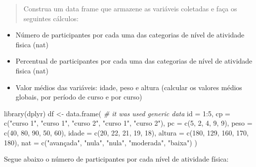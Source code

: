 \documentclass[
]{article}
\newenvironment{Shaded}{\begin{snugshade}}{\end{snugshade}}
\newcommand{\AttributeTok}[1]{\textcolor[rgb]{0.77,0.63,0.00}{#1}}
\newcommand{\CommentTok}[1]{\textcolor[rgb]{0.56,0.35,0.01}{\textit{#1}}}
\newcommand{\DecValTok}[1]{\textcolor[rgb]{0.00,0.00,0.81}{#1}}
\newcommand{\FunctionTok}[1]{\textcolor[rgb]{0.00,0.00,0.00}{#1}}
\newcommand{\NormalTok}[1]{#1}
\newcommand{\OtherTok}[1]{\textcolor[rgb]{0.56,0.35,0.01}{#1}}
\newcommand{\SpecialCharTok}[1]{\textcolor[rgb]{0.00,0.00,0.00}{#1}}
\newcommand{\StringTok}[1]{\textcolor[rgb]{0.31,0.60,0.02}{#1}}
\providecommand{\tightlist}{%
  \setlength{\itemsep}{0pt}\setlength{\parskip}{0pt}}
\begin{document}
\begin{quote}
Construa um data frame que armazene as variáveis coletadas e faça os
seguintes cálculos:
\end{quote}

\begin{itemize}
\tightlist
\item
  Número de participantes por cada uma das categorias de nível de
  atividade fisica (nat)
\item
  Percentual de participantes por cada uma das categorias de nível de
  atividade fisica (nat)
\item
  Valor médios das variáveis: idade, peso e altura (calcular os valores
  médios globais, por período de curso e por curso)
\end{itemize}

\begin{Shaded}
\begin{Highlighting}[]
\FunctionTok{library}\NormalTok{(dplyr)}
\NormalTok{df }\OtherTok{\textless{}{-}} \FunctionTok{data.frame}\NormalTok{( }\CommentTok{\# it was used generic data}
  \AttributeTok{id =} \DecValTok{1}\SpecialCharTok{:}\DecValTok{5}\NormalTok{,}
  \AttributeTok{cp =} \FunctionTok{c}\NormalTok{(}\StringTok{"curso 1"}\NormalTok{, }\StringTok{"curso 1"}\NormalTok{, }\StringTok{"curso 2"}\NormalTok{, }\StringTok{"curso 1"}\NormalTok{, }\StringTok{"curso 2"}\NormalTok{),}
  \AttributeTok{pc =} \FunctionTok{c}\NormalTok{(}\DecValTok{5}\NormalTok{, }\DecValTok{2}\NormalTok{, }\DecValTok{4}\NormalTok{, }\DecValTok{9}\NormalTok{, }\DecValTok{9}\NormalTok{),}
  \AttributeTok{peso =} \FunctionTok{c}\NormalTok{(}\DecValTok{40}\NormalTok{, }\DecValTok{80}\NormalTok{, }\DecValTok{90}\NormalTok{, }\DecValTok{50}\NormalTok{, }\DecValTok{60}\NormalTok{),}
  \AttributeTok{idade =} \FunctionTok{c}\NormalTok{(}\DecValTok{20}\NormalTok{, }\DecValTok{22}\NormalTok{, }\DecValTok{21}\NormalTok{, }\DecValTok{19}\NormalTok{, }\DecValTok{18}\NormalTok{),}
  \AttributeTok{altura =} \FunctionTok{c}\NormalTok{(}\DecValTok{180}\NormalTok{, }\DecValTok{129}\NormalTok{, }\DecValTok{160}\NormalTok{, }\DecValTok{170}\NormalTok{, }\DecValTok{180}\NormalTok{),}
  \AttributeTok{nat =} \FunctionTok{c}\NormalTok{(}\StringTok{"avançada"}\NormalTok{, }\StringTok{"nula"}\NormalTok{, }\StringTok{"nula"}\NormalTok{, }\StringTok{"moderada"}\NormalTok{, }\StringTok{"baixa"}\NormalTok{)}
\NormalTok{)}
\end{Highlighting}
\end{Shaded}

Segue abaixo o número de participantes por cada nível de atividade
física:
\end{document}
